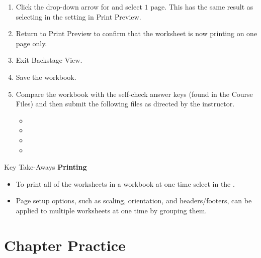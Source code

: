 \begin{enumerate}
	\item Click the drop-down arrow for  and select $ 1 $ page. This has the same result as selecting  in the  setting in Print Preview.
	\item Return to Print Preview to confirm that the  worksheet is now printing on one page only.
	\item Exit Backstage View.
	\item Save the  workbook.
	\item Compare the workbook with the self-check answer keys (found in the Course Files) and then submit the following files as directed by the instructor.
	
	\begin{itemize}
		\item {}
		\item {}
		\item {}
		\item {}
	\end{itemize}

\end{enumerate}

\begin{center}
	\begin{tkwbox}{Key Take-Aways}
		\textbf{Printing}
		\\
		\begin{itemize}
			\setlength{\itemsep}{0pt}
			\setlength{\parskip}{0pt}
			\setlength{\parsep}{0pt}
			
			\item To print all of the worksheets in a workbook at one time select  in the .
			\item Page setup options, such as scaling, orientation, and headers/footers, can be applied to multiple worksheets at one time by grouping them.
			
		\end{itemize}
	\end{tkwbox}
\end{center}

\section{Chapter Practice}


